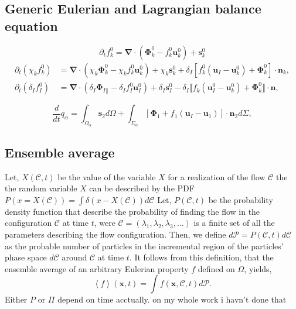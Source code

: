 \documentclass[12pt]{My_preprint}
\newcommand{\avg}[1]{\left<#1\right>}
\renewcommand{\avg}[1]{\left<#1\right>}
\newcommand{\nablab}{\mathbf{\nabla}}
\newcommand{\nablabh}{\nablab}
\newcommand{\ddt}{\frac{d}{d t}}
\newcommand{\pddt}{\frac{\partial}{\partial t}}
\renewcommand{\pddt}{\partial_t}
\newcommand{\Jump}[1]{\llbracket #1 \rrbracket \cdot \textbf{n} }
\newcommand{\tb}[1]{\color{blue}#1\color{black}}
\begin{document}
\subsection{Generic Eulerian and Lagrangian balance equation}
\begin{equation}
    \label{eq:dt_f_k}
    \pddt f_k^0
    = \nablabh \cdot \left(
        \mathbf{\Phi}_k^0
        - f_k^0\textbf{u}_k^0
        \right)
    + \textbf{s}_k^0
\end{equation}
\begin{align}
    \pddt (\chi_k f_k^0)
    &= \nablabh \cdot (\chi_k \mathbf{\Phi}_k^0 - \chi_k f_k^0 \textbf{u}_k^0)
    + \chi_k \textbf{s}_k^0
    + \delta_I\left[
        f_k^0
        \left(
            \textbf{u}_I
            - \textbf{u}_k^0
        \right)
        + \mathbf{\Phi}_k^0
    \right]
    \cdot \textbf{n}_k ,
    \label{eq:dt_chi_k_f_k}\\
    \pddt (\delta_If_I^0)  
    &= 
    \nablabh \cdot (\delta_I \mathbf{\Phi}_{I||} - \delta_I f_I^0 \textbf{u}_I^0)
    +\delta_I\textbf{s}_I^0 
    - \delta_I \Jump{
    f_k (\textbf{u}_I^0 - \textbf{u}_k^0)
    + \mathbf{\Phi}_k^0
    },
    \label{eq:dt_delta_I_f_I}
\end{align}

\begin{equation}
   \ddt q_\alpha
    = \int_{\Omega_\alpha} \textbf{s}_2 d\Omega
    + \int_{\Sigma_\alpha} \left[\mathbf{\Phi}_1 + f_1 (\textbf{u}_I-\textbf{u}_1) \right] \cdot \textbf{n}_2 d\Sigma,
    \label{eq:dt_dq_alpha_tot}
\end{equation}
\subsection{Ensemble average}

\tb{Let, $X(\mathscr{C},t)$ be the value of the variable $X$ for a realization of the flow $\mathscr{C}$ the the random variable $X$ can be described by the PDF $P(x = X(\mathscr{C})) = \int \delta(x-X(\mathscr{C})) d\mathscr{C}$ }
Let, $P(\mathscr{C},t)$ be the probability density function that describe the probability of finding the flow in the configuration $\mathscr{C}$ at time $t$, were $\mathscr{C} = (\lambda_1,\lambda_2,\lambda_3,\ldots)$ is a finite set of all the parameters describing the flow configuration. 
Then, we define $d\mathscr{P} = P(\mathscr{C},t)d\mathscr{C}$ as the probable number of particles in the incremental region of the particles' phase space $d\mathscr{C}$ around $\mathscr{C}$ at time $t$. 
It follows from this definition, that the ensemble average of an arbitrary Eulerian property $f$ defined on $\Omega$, yields,
\begin{equation}
    \avg{f}(\textbf{x},t)
    =\int f(\textbf{x},\mathscr{C},t) d\mathscr{P}. 
    \label{eq:avg}
\end{equation}  
\tb{Either $P$ or $\Pi$ depend on time acctually. on my whole work i havn't done that}
\end{document}
